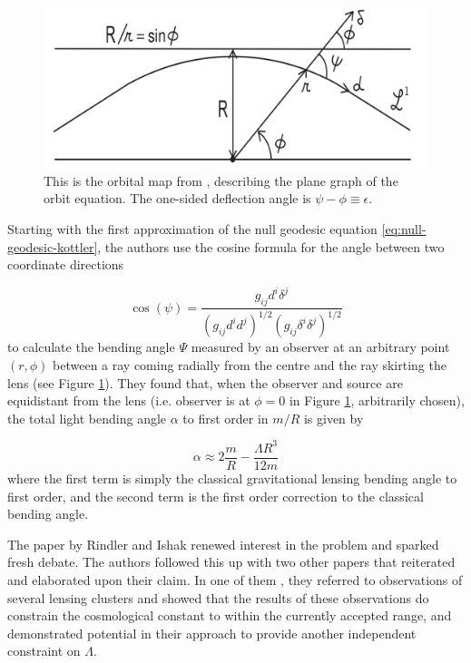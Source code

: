 \begin{figure}
  \centering
  \includegraphics{img/rindler-ishak-2.png}
  \caption{This is the orbital map from \citet{Rindler2007}, describing the plane graph of the orbit equation. The one-sided deflection angle is $\psi - \phi \equiv \epsilon$. }
  \label{fig:rindler-ishak-2}
\end{figure}

Starting with the first approximation of the null geodesic equation \eqref{eq:null-geodesic-kottler}, the authors use the cosine formula for the angle between two coordinate directions

\begin{equation}
  \cos (\psi) = \frac{g_{ij} d^i \delta ^j}{(g_{ij} d^i d^j)^{1/2} (g_{ij} \delta^i \delta^j)^{1/2}}
  \label{eq:cosine-formula}
\end{equation}
to calculate the bending angle $\Psi$ measured by an observer at an arbitrary point $(r, \phi)$ between a ray coming radially from the centre and the ray skirting the lens (see Figure \ref{fig:rindler-ishak-2}). They found that, when the observer and source are equidistant from the lens (i.e. observer is at $\phi = 0$ in Figure \ref{fig:rindler-ishak-2}, arbitrarily chosen), the total light bending angle $\alpha$ to first order in $m / R$ is given by 

\begin{equation}
  \alpha \approx 2 \frac{m}{R} - \frac{\Lambda R^3}{12m}
  \label{eq:rindler-ishak-correction}
\end{equation}
where the first term is simply the classical gravitational lensing bending angle to first order, and the second term is the first order correction to the classical bending angle. 

The paper by Rindler and Ishak renewed interest in the problem and sparked fresh debate. The authors followed this up with two other papers \citep{Ishak2008b,Ishak2008} that reiterated and elaborated upon their claim. In one of them \citep{Ishak2008b}, they referred to observations of several lensing clusters and showed that the results of these observations do constrain the cosmological constant to within the currently accepted range, and demonstrated potential in their approach to provide another independent constraint on $\Lambda$. 

